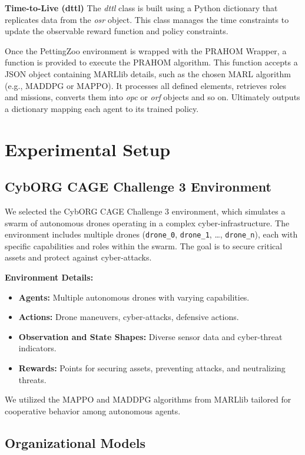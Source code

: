 \documentclass[conference]{IEEEtran}
\begin{document}
\textbf{Time-to-Live (dttl)} \quad The \textit{dttl} class is built using a Python dictionary that replicates data from the \textit{osr} object. This class manages the time constraints to update the observable reward function and policy constraints.

Once the PettingZoo environment is wrapped with the PRAHOM Wrapper, a function is provided to execute the PRAHOM algorithm. This function accepts a JSON object containing MARLlib details, such as the chosen MARL algorithm (e.g., MADDPG or MAPPO). It processes all defined elements, retrieves roles and missions, converts them into \textit{opc} or \textit{orf} objects and so on. Ultimately outputs a dictionary mapping each agent to its trained policy.

\section{Experimental Setup}

\subsection{CybORG CAGE Challenge 3 Environment}

We selected the CybORG CAGE Challenge 3 environment, which simulates a swarm of autonomous drones operating in a complex cyber-infrastructure. The environment includes multiple drones (\texttt{drone\_0}, \texttt{drone\_1}, \ldots, \texttt{drone\_n}), each with specific capabilities and roles within the swarm. The goal is to secure critical assets and protect against cyber-attacks.

\textbf{Environment Details:}
\begin{itemize}
    \item \textbf{Agents:} Multiple autonomous drones with varying capabilities.
    \item \textbf{Actions:} Drone maneuvers, cyber-attacks, defensive actions.
    \item \textbf{Observation and State Shapes:} Diverse sensor data and cyber-threat indicators.
    \item \textbf{Rewards:} Points for securing assets, preventing attacks, and neutralizing threats.
\end{itemize}

We utilized the MAPPO and MADDPG algorithms from MARLlib tailored for cooperative behavior among autonomous agents.

\subsection{Organizational Models}
\end{document}
